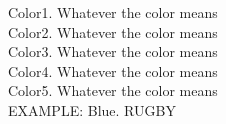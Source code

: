 \documentclass[10pt,spanish, landscape, twocolumn]{article}
\begin{document}
\begin{flushright}
	Color1. Whatever the color means \\[0.5cm]
	
	Color2. Whatever the color means \\[0.5cm]
	
	Color3. Whatever the color means \\[0.5cm]
	
	Color4. Whatever the color means \\[0.5cm]
	
	Color5. Whatever the color means \\[0.5cm]
	
	EXAMPLE: Blue. RUGBY
	
\end{flushright}
\end{document}
